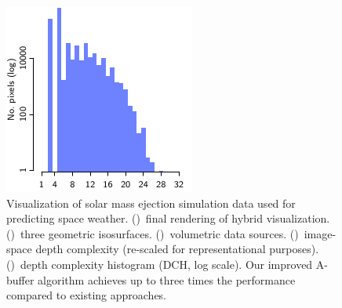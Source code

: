 \documentclass{egpubl}
\newcommand{\ab}{\mbox{A-buffer}}
\newlength{\boxheight}
\begin{document}
\begin{figure}[p]
\begin{minipage}[b][\boxheight][b]{0.24\linewidth}
\begin{minipage}[b]{0.98\linewidth}
      \includegraphics[width=1\linewidth]{figures/plot-dch-space}\vspace{-2mm}
    \end{minipage}%
  \end{minipage}%
  \caption{\label{fig:space}%
    Visualization of solar mass ejection simulation data used for predicting space weather. 
    ()~final rendering of hybrid visualization.
    ()~three geometric isosurfaces.
    ()~volumetric data sources. %
    ()~image-space depth complexity (re-scaled for representational purposes). 
    ()~depth complexity histogram (DCH, log scale).
    Our improved \ab{} algorithm achieves up to three times the performance compared to existing approaches. %
  }
\end{figure}
\end{document}
